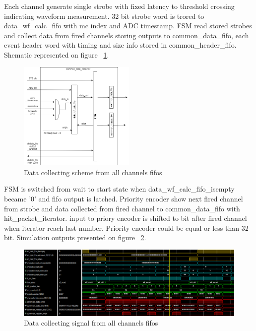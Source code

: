 \documentclass{article}
\begin{document}
Each channel generate single strobe with fixed latency to threshold crossing indicating waveform measurement. 32 bit strobe word is trored to data\_wf\_calc\_fifo with mc index and ADC timestamp. FSM read stored strobes and collect data from fired channels storing outputs to common\_data\_fifo, each event header word with timing and size info stored in common\_header\_fifo. Shematic represented on figure ~\ref{fig:3}.

\begin{figure}[H]
	\centering 
	\includegraphics[width=0.5\textwidth]{ADC_common_event_collection.png}
	\caption{\label{fig:3} Data collecting scheme from all channels fifos}
\end{figure}


FSM is switched from wait to start state when data\_wf\_calc\_fifo\_isempty became '0' and fifo output is latched. Priority encoder show next fired channel from strobe and data collected from fired channel to common\_data\_fifo with hit\_packet\_iterator. input to priory encoder is shifted to bit after fired channel when iterator reach last number. Priority encoder could be equal or less than 32 bit. Simulation outputs presented on figure ~\ref{fig:4}.

\begin{figure}[H]
	\centering 
	\includegraphics[width=1.0\textwidth]{ADC_common_data_collector_wave.png}
	\caption{\label{fig:4} Data collecting signal from all channels fifos}
\end{figure}
\end{document}
